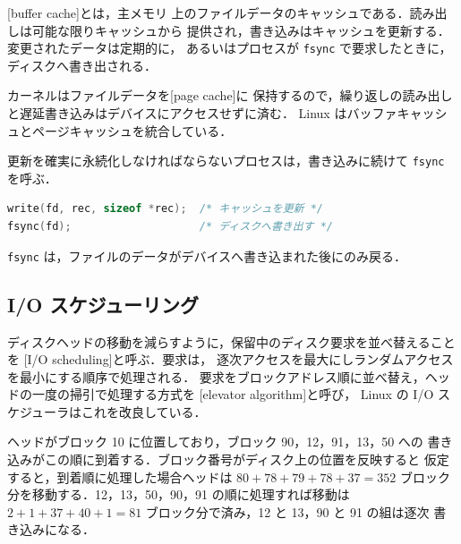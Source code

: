 \documentclass[../main.tex]{subfiles}
\begin{document}
\begin{definition}[バッファキャッシュ]
  [buffer cache]とは，主メモリ
  上のファイルデータのキャッシュである．読み出しは可能な限りキャッシュから
  提供され，書き込みはキャッシュを更新する．変更されたデータは定期的に，
  あるいはプロセスが \texttt{fsync} で要求したときに，ディスクへ書き出される．%
\end{definition}

カーネルはファイルデータを[page cache]に
保持するので，繰り返しの読み出しと遅延書き込みはデバイスにアクセスせずに済む．
Linux はバッファキャッシュとページキャッシュを統合している．

更新を確実に永続化しなければならないプロセスは，書き込みに続けて
\texttt{fsync} を呼ぶ．
\begin{lstlisting}[language=C, numbers=none]
write(fd, rec, sizeof *rec);  /* キャッシュを更新 */
fsync(fd);                    /* ディスクへ書き出す */
\end{lstlisting}
\texttt{fsync} は，ファイルのデータがデバイスへ書き込まれた後にのみ戻る．

\subsection{I/O スケジューリング}

ディスクヘッドの移動を減らすように，保留中のディスク要求を並べ替えることを
[I/O scheduling]と呼ぶ．要求は，
逐次アクセスを最大にしランダムアクセスを最小にする順序で処理される．
要求をブロックアドレス順に並べ替え，ヘッドの一度の掃引で処理する方式を
[elevator algorithm]と呼び，
Linux の I/O スケジューラはこれを改良している．

\begin{example}
  ヘッドがブロック 10 に位置しており，ブロック 90，12，91，13，50 への
  書き込みがこの順に到着する．ブロック番号がディスク上の位置を反映すると
  仮定すると，到着順に処理した場合ヘッドは $80+78+79+78+37 = 352$ ブロック
  分を移動する．12，13，50，90，91 の順に処理すれば移動は
  $2+1+37+40+1 = 81$ ブロック分で済み，12 と 13，90 と 91 の組は逐次
  書き込みになる．
\end{example}
\end{document}
